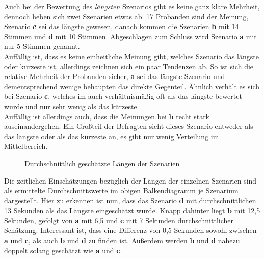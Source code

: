 \documentclass{Paper}
\begin{document}
Auch bei der Bewertung des \textit{längsten} Szenarios gibt es keine ganz klare Mehrheit, dennoch heben sich zwei Szenarien etwas ab. 17 Probanden sind der Meinung, Szenario \textbf{c} sei das längste gewesen, danach kommen die Szenarien \textbf{b} mit 14 Stimmen und \textbf{d} mit 10 Stimmen. Abgeschlagen zum Schluss wird Szenario \textbf{a} mit nur 5 Stimmen genannt.\\
Auffällig ist, dass es keine einheitliche Meinung gibt, welches Szenario das längste oder kürzeste ist, allerdings zeichnen sich ein paar Tendenzen ab. So ist sich die relative Mehrheit der Probanden sicher, \textbf{a} sei das längste Szenario und dementsprechend wenige behaupten das direkte Gegenteil. Ähnlich verhält es sich bei Szenario \textbf{c}, welches im auch verhältnismäßig oft als das längste bewertet wurde und nur sehr wenig als das kürzeste.\\
Auffällig ist allerdings auch, dass die Meinungen bei \textbf{b} recht stark auseinandergehen. Ein Großteil der Befragten sieht dieses Szenario entweder als das längste oder als das kürzeste an, es gibt nur wenig Verteilung im Mittelbereich.
	
	
	
\begin{figure}	[H]
\caption{Durchschnittlich geschätzte Längen der Szenarien}
\label{LaengeSzenarien}
\end{figure}
\par
Die zeitlichen Einschätzungen bezüglich der Längen der einzelnen Szenarien sind als ermittelte Durchschnittswerte im obigen Balkendiagramm je Szenarium dargestellt. Hier zu erkennen ist nun, dass das Szenario \textbf{d} mit durchschnittlichen 13 Sekunden als das Längste eingeschätzt wurde. Knapp dahinter liegt \textbf{b} mit 12,5 Sekunden, gefolgt von \textbf{a} mit 6,5 und \textbf{c} mit 7 Sekunden durchschnittlicher Schätzung.
Interessant ist, dass eine Differenz von 0,5 Sekunden sowohl zwischen \textbf{a} und \textbf{c}, als auch \textbf{b} und \textbf{d} zu finden ist. Außerdem werden \textbf{b} und \textbf{d} nahezu doppelt solang geschätzt wie \textbf{a} und \textbf{c}.
\end{document}
